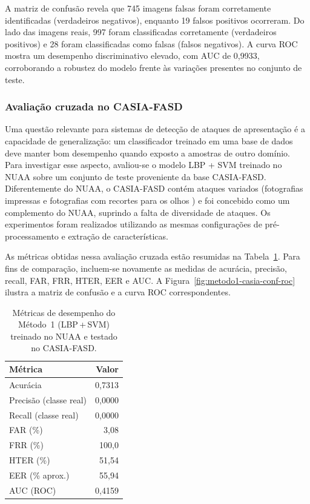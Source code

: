\documentclass[
	article,			%
	11pt,				%
	oneside,			%
	a4paper,			%
	english,			%
	brazil,				%
	sumario=tradicional
	]{abntex2}
\begin{document}
A matriz de confusão revela que 745 imagens falsas foram corretamente identificadas (verdadeiros negativos), enquanto 19 falsos positivos ocorreram. Do lado das imagens reais, 997 foram classificadas corretamente (verdadeiros positivos) e 28 foram classificadas como falsas (falsos negativos). A curva ROC mostra um desempenho discriminativo elevado, com AUC de 0,9933, corroborando a robustez do modelo frente às variações presentes no conjunto de teste.

\subsubsection{Avaliação cruzada no CASIA-FASD}

Uma questão relevante para sistemas de detecção de ataques de apresentação é a capacidade de generalização: um classificador treinado em uma base de dados deve manter bom desempenho quando exposto a amostras de outro domínio. Para investigar esse aspecto, avaliou-se o modelo LBP + SVM treinado no NUAA sobre um conjunto de teste proveniente da base CASIA-FASD. Diferentemente do NUAA, o CASIA-FASD contém ataques variados (fotografias impressas e fotografias com recortes para os olhos ) e foi concebido como um complemento do NUAA, suprindo a falta de diversidade de ataques. Os experimentos foram realizados utilizando as mesmas configurações de pré-processamento e extração de características.

As métricas obtidas nessa avaliação cruzada estão resumidas na Tabela~\ref{tab:metodo1-casia-metricas}. Para fins de comparação, incluem-se novamente as medidas de acurácia, precisão, recall, FAR, FRR, HTER, EER e AUC. A Figura~\ref{fig:metodo1-casia-conf-roc} ilustra a matriz de confusão e a curva ROC correspondentes.

\begin{table}[H]
  \centering
  \caption{Métricas de desempenho do Método 1 (LBP\,+\,SVM) treinado no NUAA e testado no CASIA-FASD.}
  \label{tab:metodo1-casia-metricas}
  \begin{tabular}{lr}
    \hline
    \textbf{Métrica} & \textbf{Valor} \\
    \hline
    Acurácia & 0,7313 \\
    Precisão (classe real) & 0,0000 \\
    Recall (classe real) & 0,0000 \\
    FAR (\%) & 3,08 \\
    FRR (\%) & 100,0 \\
    HTER (\%) & 51,54 \\
    EER (\% aprox.) & 55,94 \\
    AUC (ROC) & 0,4159 \\
    \hline
  \end{tabular}
\end{table}
\end{document}
